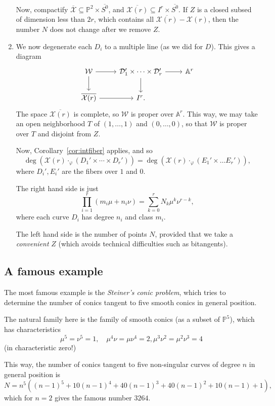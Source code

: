 \documentclass[leqno, openany]{memoir}
\theoremstyle{definition}
\theoremstyle{remark}
\theoremstyle{plain}
\theoremstyle{definition}
\theoremstyle{remark}
\newcommand{\A}{\mathbb{A}}
\renewcommand{\P}{\mathbb{P}}
\newcommand{\mc}[1]{\mathcal{#1}}
\begin{document}
\begin{enumerate}
Now, compactify $\overline{\mc{X}} \subseteq \P^2 \times \overline{S^0}$, and $\overline{\mc{X}(r)}\subseteq I^r \times \overline{S^0}$. If $Z$ is a closed subsed of dimension less than $2r$, which contains all $\overline{\mc{X}(r)}-\mc{X}(r)$, then the number $N$ does not change after we remove $Z$.
    \item We now degenerate each $D_i$ to a multiple line (as we did for $D$). This gives a diagram
\[ \begin{tikzcd} \mc{W} \arrow[r] \arrow[d] & \mc{D}_1' \times \cdots \times \mc{D}_r' \arrow[r] \arrow[d] & \A^r \\ \overline{\mc{X}(r)} \arrow[r]& I^r. \end{tikzcd} \]
The space $\overline{\mc{X}(r)}$ is complete, so $\mc{W}$ is proper over $\A^r$. This way, we may take an open neighborhood $T$ of $(1, \dots, 1)$ and $(0, \dots, 0)$, so that $\mc{W}$ is proper over $T$ and disjoint from $Z$. 

Now, Corollary~\ref{cor:intfiber} applies, and so
\[ \deg(\mc{X}(r) \cdot_\varphi (D_1' \times \cdots \times D_r')) = \deg(\mc{X}(r) \cdot_\varphi (E_1' \times \dots E_r')), \]
where $D_i', E_i'$ are the fibers over $1$ and $0$.

The right hand side is just
\[ \prod_{i=1}^r (m_i \mu + n_i \nu) = \sum_{k=0}^r N_k \mu^k \nu^{r-k}, \]
where each curve $D_i$ has degree $n_i$ and class $m_i$. 

The left hand side is the number of points $N$, provided that we take a \emph{convenient} $Z$ (which avoids technical difficulties such as bitangents). 
\end{enumerate}

\subsection{A famous example}%
\label{sub:a_famous_example}

The most famous example is the \emph{Steiner's conic problem}, which tries to determine the number of conics tangent to five smooth conics in general position. 

The natural family here is the family of smooth conics (as a subset of $\P^5$), which has characteristics
\[ \mu^5=\nu^5=1, \quad \mu^4\nu=\mu\nu^4=2, \mu^3\nu^2=\mu^2\nu^3=4 \]
(in characteristic zero!)

This way, the number of conics tangent to five non-singular curves of degree $n$ in general position is
\[ N=n^5({ (n-1) }^5+10{ (n-1) }^4+40{ (n-1) }^3+40{ (n-1) }^2+10(n-1)+1), \]
which for $n=2$ gives the famous number $3264$. 
\end{document}
